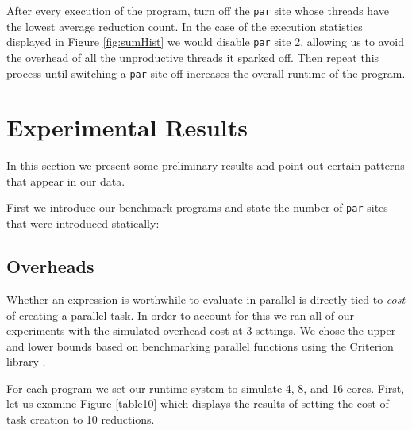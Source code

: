 After every execution of the program, turn off the \verb'par' site whose threads
have the lowest average reduction count. In the case of the execution statistics
displayed in Figure \ref{fig:sumHist} we would disable \verb-par- site 2, allowing
us to avoid the overhead of all the unproductive threads it sparked off.  Then
repeat this process until switching a \verb'par' site off increases the overall
runtime of the program.

\section{Experimental Results}
\label{sec:results}

In this section we present some preliminary results and point out certain patterns
that appear in our data. 

First we introduce our benchmark programs and state the number of \verb-par-
sites that were introduced statically:

\subsection*{Overheads} Whether an expression is worthwhile to evaluate in
parallel is directly tied to \emph{cost} of creating a parallel task. In order
to account for this we ran all of our experiments with the simulated overhead
cost at 3 settings. We chose the upper and lower bounds based on benchmarking parallel
functions using the Criterion library \citep{criterion}.


For each program we set our runtime system to simulate 4, 8, and 16 cores.
First, let us examine Figure \ref{table10} which displays the results of setting
the cost of task creation to 10 reductions.

